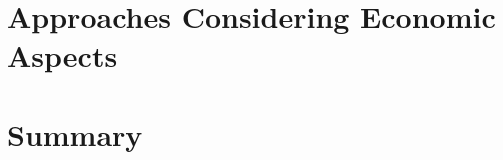 \section{Approaches Considering Economic Aspects} %
\label{sec:approaches_considering_economic_aspects_intelligent}


\section{Summary} %
\label{sec:summary_intelligent}

